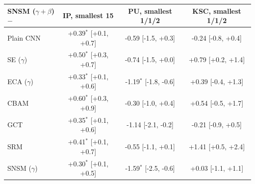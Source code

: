 \begin{tabular}{lccc}
\toprule
SNSM ($\gamma{+}\beta$) $-$ & IP, smallest 15 & PU, smallest 1/1/2 & KSC, smallest 1/1/2 \\
\midrule
Plain CNN & +0.39$^{*}$ [+0.1, +0.7] & -0.59 [-1.5, +0.3] & -0.24 [-0.8, +0.4] \\
SE ($\gamma$) & +0.50$^{*}$ [+0.3, +0.7] & -0.74 [-1.5, +0.0] & +0.79 [+0.2, +1.4] \\
ECA ($\gamma$) & +0.33$^{*}$ [+0.1, +0.6] & -1.19$^{*}$ [-1.8, -0.6] & +0.39 [-0.4, +1.3] \\
CBAM & +0.60$^{*}$ [+0.3, +0.9] & -0.30 [-1.0, +0.4] & +0.54 [-0.5, +1.7] \\
GCT & +0.35$^{*}$ [+0.1, +0.6] & -1.14 [-2.1, -0.2] & -0.21 [-0.9, +0.5] \\
SRM & +0.41$^{*}$ [+0.1, +0.7] & -0.55 [-1.1, +0.1] & +1.41 [+0.5, +2.4] \\
SNSM ($\gamma$) & +0.30$^{*}$ [+0.1, +0.5] & -1.59$^{*}$ [-2.5, -0.6] & +0.03 [-1.1, +1.1] \\
\bottomrule
\end{tabular}
